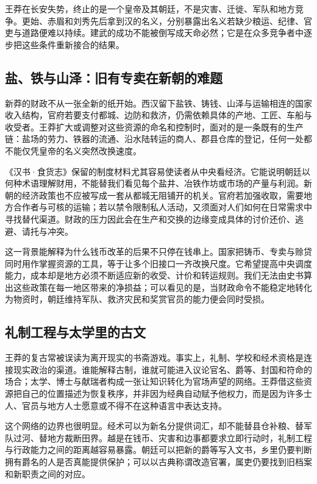 \begin{turningpoint}
王莽在长安失势，终止的是一个皇帝及其朝廷，不是灾害、迁徙、军队和地方竞争。更始、赤眉和刘秀先后拿到汉的名义，分别暴露出名义若缺少粮运、纪律、官吏与道路便难以持续。建武的成功不能被倒写成天命必然；它是在众多竞争者中逐步把这些条件重新接合的结果。
\end{turningpoint}

\subsection{盐、铁与山泽：旧有专卖在新朝的难题}

新莽的财政不从一张全新的纸开始。西汉留下盐铁、铸钱、山泽与运输相连的国家收入结构，官府若要支付都城、边防和救济，仍需依赖具体的产地、工匠、车船与收受者。王莽扩大或调整对这些资源的命名和控制时，面对的是一条既有的生产链：盐场的劳力、铁器的流通、沿水陆转运的商人、郡县仓库的登记，任何一处都不能仅凭皇帝的名义突然改换速度。

《汉书·食货志》保留的制度材料尤其容易使读者从中央看经济。它能说明朝廷以何种术语理解财用，不能替我们看见每个盐井、冶铁作坊或市场的产量与利润。新朝的经济政策也不应被写成一套从都城无阻铺开的机关。官府若加强收取，需要地方合作者与可核的运输；若以禁令限制私人活动，又须面对人们如何在日常需求中寻找替代渠道。财政的压力因此会在生产和交换的边缘变成具体的讨价还价、逃避、请托与冲突。

这一背景能解释为什么钱币改革的后果不只停在钱串上。国家把铸币、专卖与赊贷同时用作掌握资源的工具，等于让多个旧接口一齐改换尺度。它希望提高中央调度能力，成本却是地方必须不断适应新的收受、计价和转运规则。我们无法由史书算出这些政策在每一地区带来的净损益；可以看见的是，当财政命令不能稳定地转化为物资时，朝廷维持军队、救济灾民和奖赏官员的能力便会同时受损。

\subsection{礼制工程与太学里的古文}

王莽的复古常被误读为离开现实的书斋游戏。事实上，礼制、学校和经术资格是连接现实政治的渠道。谁能解释古制，谁就可能进入议论官名、爵等、封国和符命的场合；太学、博士与献瑞者构成一张让知识转化为官场声望的网络。王莽借这些资源把自己的位置描述为恢复秩序，并非因为经典自动赋予他权力，而是因为许多士人、官员与地方人士愿意或不得不在这种语言中表达支持。

这个网络的边界也很明显。经术可以为新名分提供词汇，却不能替县仓补粮、替军队过河、替地方裁断田界。越是在钱币、灾害和边事都要求立即行动时，礼制工程与行政能力之间的距离越容易暴露。朝廷可以把新的爵等写入文书，乡里仍要判断拥有爵名的人是否真能提供保护；可以以古典称谓改造官署，属吏仍要找到旧档案和新职责之间的对应。

